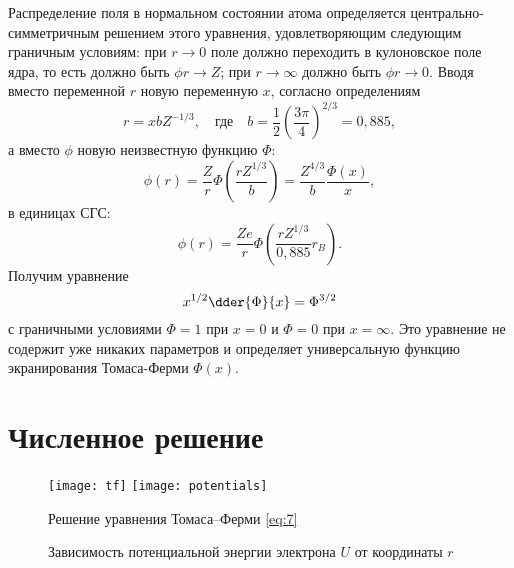   Распределение поля в нормальном состоянии атома определяется
  центрально-симметричным решением этого уравнения, удовлетворяющим следующим
  граничным условиям: при \( r \to 0 \) поле должно переходить в кулоновское
  поле ядра, то есть должно быть \( \phi r \to Z \); при \( r \to \infty \)
  должно быть \( \phi r \to 0 \). Вводя вместо переменной \( r \) новую
  переменную \( x \), согласно определениям
  \begin{equation}
    r = xbZ^{-1 / 3}, \quad\text{где}\quad b = \frac{1}{2} \left(
      \frac{3\pi}{4} \right)^{2 / 3} = 0,\!885,
    \label{eq:5}
  \end{equation}
  а вместо \( \phi \) новую неизвестную функцию \( \Phi \):
  \begin{equation}
    \phi(r) = \frac{Z}{r} \Phi \left( \frac{rZ^{1 / 3}}{b} \right) =
      \frac{Z^{4 / 3}}{b} \frac{\Phi(x)}{x},
    \label{eq:6}
  \end{equation}
  в единицах СГС:
  \[
    \phi(r) = \frac{Ze}{r} \Phi \left( \frac{rZ^{1 / 3}}{0,\!885}r_B \right).
  \]
  Получим уравнение
  \begin{equation}
    x^{1 / 2} \dder{\Phi}{x} = \Phi^{3 / 2}
    \label{eq:7}
  \end{equation}
  с граничными условиями \( \Phi = 1 \) при \( x = 0 \) и \( \Phi = 0 \) при
  \( x = \infty \). Это уравнение не содержит уже никаких параметров и
  определяет универсальную функцию экранирования Томаса-Ферми \( \Phi(x) \).

  \section{Численное решение}
  \begin{figure}[h!]
    \vspace{-1em} \hspace{-2em}
      \texttt{[image: tf]} \hspace{-3em}
      \texttt{[image: potentials]} \\
    \parbox{.49\textwidth}{\caption{Решение уравнения Томаса--Ферми
      \eqref{eq:7}} \label{fig:1}}
      \parbox{.49\textwidth}{\caption{Зависимость потенциальной энергии
      электрона \( U \) от координаты \( r \)} \label{fig:2}}
  \end{figure}
